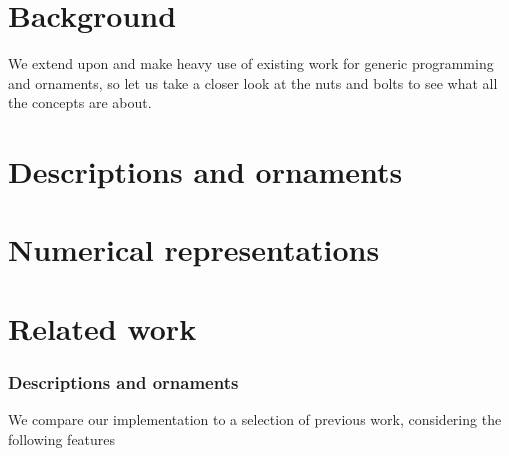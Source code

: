 \documentclass[10pt]{article}
\theoremstyle{plain}
\theoremstyle{definition}
\begin{document}
\part*{Background}\label{part:background}
We extend upon and make heavy use of existing work for generic programming and ornaments, so let us take a closer look at the nuts and bolts to see what all the concepts are about.




\part{Descriptions and ornaments}\label{part:ornament}



\part{Numerical representations}\label{part:numrep}



\part{Related work}\label{part:related}
\section{Descriptions and ornaments}
We compare our implementation to a selection of previous work, considering the following features
\end{document}
